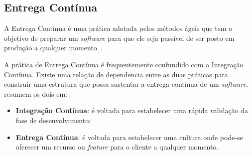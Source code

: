 \subsection{Entrega Contínua}

A Entrega Contínua é uma prática adotada pelos métodos ágeis que tem o objetivo
de preparar um \textit{software} para que ele seja passível de ser posto em produção a
qualquer momento~\cite{olausson:2016}. 

A prática de Entrega Contínua  é frequentemente confundido com a Integração
Contínua. Existe uma relação de dependencia entre as duas práticas para
construir uma estrutura que possa sustentar a entrega contínua de um
\textit{software}.~ resumem os dois em:

\begin{itemize}
  \item \textbf{Integração Contínua}: é voltada para estabelecer uma rápida
    validação da fase de desenvolvimento;
  \item \textbf{Entrega Contínua}: é voltada para estabelecer uma cultura onde
    pode-se oferecer um recurso ou \textit{feature} para o cliente a qualquer
    momento.
\end{itemize}


